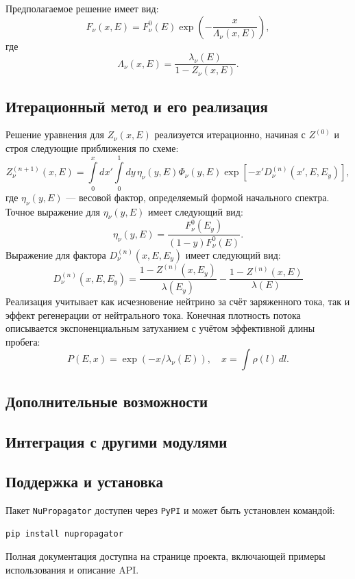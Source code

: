 Предполагаемое решение имеет вид:
\begin{equation}
F_{\nu}(x,E) = F^{0}_{\nu}(E)\exp\left(-\frac{x}{\Lambda_{\nu}(x,E)}\right),
\end{equation}
где 
\begin{equation}
\Lambda_{\nu}(x,E) = \frac{\lambda_{\nu}(E)}{1 - Z_{\nu}(x,E)}.
\end{equation}

\subsection{Итерационный метод и его реализация}

Решение уравнения для $Z_{\nu}(x,E)$ реализуется итерационно, начиная с $Z^{(0)}$ и строя следующие приближения по схеме:
\begin{equation}
Z^{(n+1)}_{\nu}(x,E) = \int\limits_0^x dx' \int\limits_0^1 dy\,\eta_{\nu}(y,E)\Phi_{\nu}(y,E)\exp\left[ -x'D^{(n)}_{\nu}(x',E,E_y) \right],
\end{equation}
где $\eta_{\nu}(y,E)$ — весовой фактор, определяемый формой начального спектра. Точное выражение для $\eta_{\nu}(y,E)$ имеет следующий вид: 
\begin{equation}
    \eta_{\nu}(y,E) = \frac{F^0_{\nu}(E_y)}{(1-y)F^0_{\nu}(E)}.
\end{equation}
Выражение для фактора $D^{(n)}_{\nu}(x, E, E_y)$ имеет следующий вид:
\begin{equation}
    D^{(n)}_{\nu}(x, E, E_y) = \frac{1-Z^{(n)}(x, E_y)}{\lambda(E_y)} - \frac{1-Z^{(n)}(x, E)}{\lambda(E)}
\end{equation}
Реализация учитывает как исчезновение нейтрино за счёт заряженного тока, так и эффект регенерации от нейтрального тока. Конечная плотность потока описывается экспоненциальным затуханием с учётом эффективной длины пробега:
\begin{equation}
P(E,x) = \exp(-x/\lambda_{\nu}(E)), \quad x = \int\rho(l)\,dl.
\end{equation}

\subsection{Дополнительные возможности}

\subsection{Интеграция с другими модулями}

\subsection{Поддержка и установка}

Пакет \texttt{NuPropagator} доступен через \texttt{PyPI} и может быть установлен командой:
\begin{verbatim}
pip install nupropagator
\end{verbatim}
Полная документация доступна на странице проекта, включающей примеры использования и описание API.
